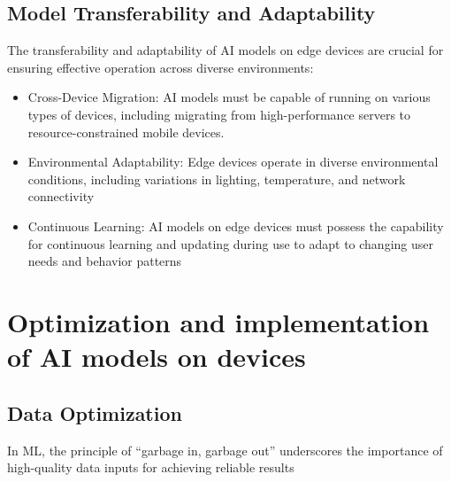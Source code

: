 \subsection{Model Transferability and Adaptability}

The transferability and adaptability of AI models on edge devices are crucial for ensuring effective operation across diverse environments:
\begin{itemize}
	\item Cross-Device Migration: AI models must be capable of running on various types of devices, including migrating from high-performance servers to resource-constrained mobile devices.
	\item Environmental Adaptability: Edge devices operate in diverse environmental conditions, including variations in lighting, temperature, and network connectivity
	\item Continuous Learning: AI models on edge devices must possess the capability for continuous learning and updating during use to adapt to changing user needs and behavior patterns
\end{itemize}

\section{Optimization and implementation of AI models on devices}

\subsection{Data Optimization}
In ML, the principle of ``garbage in, garbage out'' underscores the importance of high-quality data inputs for achieving reliable results

